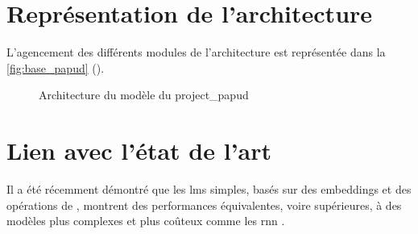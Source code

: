 
\section{Représentation de l'architecture}

L'agencement des différents modules de l'architecture est représentée dans la \autoref{fig:base_papud} ().

\begin{figure}[ht]
	\centering
	
	\caption[Architecture du modèle du projet PAPUD]{Architecture du modèle du \gls{project_papud}}
	\label{fig:base_papud}
\end{figure}

\section{Lien avec l'état de l'art}
Il a été récemment démontré que les \glspl{lm} simples, basés sur des  \glspl{embedding} et des opérations de ,
montrent des performances équivalentes, voire supérieures, à des modèles plus complexes et plus coûteux comme les \gls{rnn} \autocite{pooling_simple}.

%
%
%
%
%
